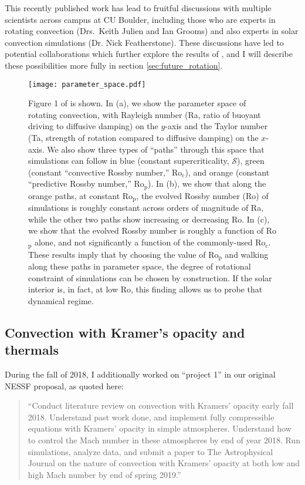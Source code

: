 \documentclass[aasms,12pt]{article}
\begin{document}
This recently published work has lead to fruitful discussions with multiple scientists across
campus at CU Boulder, including those who are experts in rotating convection 
(Drs.~Keith Julien and Ian Grooms)
and also experts in solar convection simulations (Dr. Nick Featherstone).
These discussions have led to potential collaborations which further explore the results
of \citet{anders&all2019}, and I will describe these possibilities
more fully in section \ref{sec:future_rotation}.

\begin{figure}[b!]
\centering
\texttt{[image: parameter\_space.pdf]}
\caption{Figure 1 of \citet{anders&all2019} is shown. In (a), we show the parameter space
of rotating convection, with Rayleigh number (Ra, ratio of buoyant driving to diffusive damping)
on the $y$-axis and the Taylor number (Ta, strength of rotation compared to diffusive damping)
on the $x$-axis. We also show three types of ``paths'' through this space that simulations
can follow in blue (constant supercriticality, $\mathcal{S}$), green
(constant ``convective Rossby number,'' Ro$_{\text{c}}$), and orange 
(constant ``predictive Rossby number,'' Ro$_{\text{p}}$). 
In (b), we show that along the orange paths, at
constant Ro$_\text{p}$, the evolved Rossby number (Ro) of simulations is
roughly constant across orders of magnitude of Ra, while the other two paths show
increasing or decreasing Ro. In (c), we show that the evolved Rossby number
is roughly a function of Ro$_\text{p}$ alone, and not significantly a function
of the commonly-used Ro$_{\text{c}}$. These results imply that by choosing the value of
Ro$_\text{p}$ and walking along these paths in parameter space, the degree of rotational
constraint of simulations can be chosen by construction. If the solar interior is, in fact,
at low Ro, this finding allows us to probe that dynamical regime.
\label{fig:rossby}}
\end{figure}

\subsection{Convection with Kramer's opacity and thermals}
\label{sec:thermals}
During the fall of 2018, I additionally
worked on ``project 1'' in our original NESSF proposal, as quoted here:

\begin{quote}
``Conduct literature review on convection with Kramers' opacity early fall 2018.  
Understand past work done, and implement fully compressible equations with Kramers'
opacity in simple atmospheres.  Understand how to control the Mach number in these
atmospheres by end of year 2018.  Run simulations, analyze data, and submit a paper to The Astrophysical Journal
on the nature of convection with Kramers' opacity at both low and high Mach number by
end of spring 2019.''
\end{quote}
\end{document}
